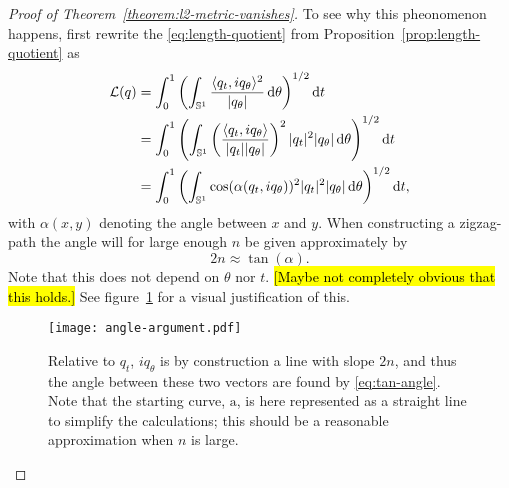 \message{ !name(mainfile.tex)}\documentclass[a4,danish]{article}
\begin{document}
\begin{proof}[Proof of Theorem~\ref{theorem:l2-metric-vanishes}]
  To see why this  pheonomenon happens, first rewrite the \eqref{eq:length-quotient} from Proposition~\ref{prop:length-quotient} as
  \begin{align*}
    \mathcal{L}(q) &
                     = \int_{0}^{1}
                     \left(
                     \int_{\mathbb{S}^{1}} \frac{\langle q_{t},i q_{\theta}\rangle^2}
                     {|q_{\theta}|}  \mathop{}\!\mathrm{d} \theta
                     \right)^{1/2} \mathop{}\!\mathrm{d} t \\
                   & =  \int_{0}^{1}
                     \left(
                     \int_{\mathbb{S}^{1}}
                     \left(
                     \frac{\langle q_{t},i
                     q_{\theta}\rangle}{| q_{t}|| q_{\theta}|}
                     \right)^2
                     | q_t|^2   | q_{\theta}|
                     \mathop{}\!\mathrm{d} \theta
                     \right)^{1/2} \mathop{}\!\mathrm{d} t \\
                   &  =
                     \int_{0}^{1}
                     \left(
                     \int_{\mathbb{S}^{1}}
                     \cos(\alpha( q_t, i q_{\theta}))^2
                     | q_t|^2   | q_{\theta}|
                     \mathop{}\!\mathrm{d} \theta
                     \right)^{1/2}\mathop{}\!\mathrm{d} t,
  \end{align*}
  with $\alpha(x,y)$ denoting the angle between $x$ and $y$.
  When constructing a zigzag-path the angle will for large enough $n$ be given approximately by
  \begin{equation}
    \label{eq:tan-angle}
    2n \approx \tan(\alpha).
  \end{equation}
  Note that this does not depend on $\theta$ nor $t$.
  \hl{[Maybe not completely obvious that this holds.]}
  See figure~\ref{fig:angle-arg} for a visual justification of this.
  \begin{figure}[h]
    \centering
    \texttt{[image: angle-argument.pdf]}
    \caption{Relative to $q_t$, $iq_{\theta}$ is by construction a line with slope $2n$, and thus the angle between these two vectors are found by \eqref{eq:tan-angle}. Note that the starting curve, $\mathrm{a}$, is here represented as a straight line to simplify the calculations; this should be a reasonable approximation when $n$ is large.}
    \label{fig:angle-arg}
  \end{figure}


\end{proof}
\end{document}

